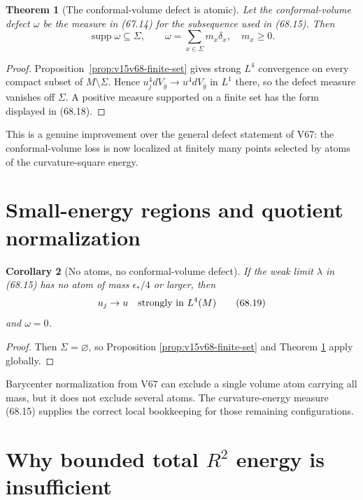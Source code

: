 \documentclass[11pt]{article}
\newtheorem{theorem}{Theorem}[section]
\newtheorem{corollary}[theorem]{Corollary}
\theoremstyle{remark}
\begin{document}
\begin{theorem}[The conformal-volume defect is atomic]
\label{thm:v15v68-atomic-defect}
Let the conformal-volume defect \(\omega\) be the measure in
(67.14) for the subsequence used in (68.15).  Then
\[
 \operatorname{supp}\omega\subseteq\Sigma,\qquad
 \omega=\sum_{x\in\Sigma}m_x\delta_x,\quad m_x\geq0.   \tag{68.18}
\]
\end{theorem}

\begin{proof}
Proposition~\ref{prop:v15v68-finite-set} gives strong \(L^4\)
convergence on every compact subset of \(M\setminus\Sigma\).
Hence \(u_j^4dV_{\bar g}\to u^4dV_{\bar g}\) in \(L^1\) there, so
the defect measure vanishes off \(\Sigma\).  A positive measure
supported on a finite set has the form displayed in (68.18).
\end{proof}

This is a genuine improvement over the general defect statement
of V67: the conformal-volume loss is now localized at finitely many
points selected by atoms of the curvature-square energy.

\section{Small-energy regions and quotient normalization}

\begin{corollary}[No atoms, no conformal-volume defect]
\label{cor:v15v68-no-atoms}
If the weak limit \(\lambda\) in (68.15) has no atom of mass
\(\epsilon_*/4\) or larger, then
\[
 u_j\to u\quad\hbox{strongly in }L^4(M)                \tag{68.19}
\]
and \(\omega=0\).
\end{corollary}

\begin{proof}
Then \(\Sigma=\varnothing\), so Proposition
\ref{prop:v15v68-finite-set} and Theorem
\ref{thm:v15v68-atomic-defect} apply globally.
\end{proof}

Barycenter normalization from V67 can exclude a single volume
atom carrying all mass, but it does not exclude several atoms.
The curvature-energy measure (68.15) supplies the correct local
bookkeeping for those remaining configurations.

\section{Why bounded total \(R^2\) energy is insufficient}
\end{document}

